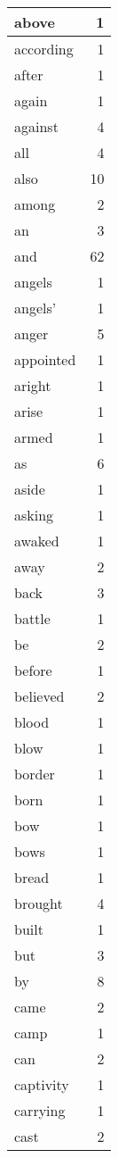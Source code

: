 \begin{center}
\begin{longtable}{l|r}
above & 1\\ \hline 
according & 1\\ \hline 
after & 1\\ \hline 
again & 1\\ \hline 
against & 4\\ \hline 
all & 4\\ \hline 
also & 10\\ \hline 
among & 2\\ \hline 
an & 3\\ \hline 
and & 62\\ \hline 
angels & 1\\ \hline 
angels' & 1\\ \hline 
anger & 5\\ \hline 
appointed & 1\\ \hline 
aright & 1\\ \hline 
arise & 1\\ \hline 
armed & 1\\ \hline 
as & 6\\ \hline 
aside & 1\\ \hline 
asking & 1\\ \hline 
awaked & 1\\ \hline 
away & 2\\ \hline 
back & 3\\ \hline 
battle & 1\\ \hline 
be & 2\\ \hline 
before & 1\\ \hline 
believed & 2\\ \hline 
blood & 1\\ \hline 
blow & 1\\ \hline 
border & 1\\ \hline 
born & 1\\ \hline 
bow & 1\\ \hline 
bows & 1\\ \hline 
bread & 1\\ \hline 
brought & 4\\ \hline 
built & 1\\ \hline 
but & 3\\ \hline 
by & 8\\ \hline 
came & 2\\ \hline 
camp & 1\\ \hline 
can & 2\\ \hline 
captivity & 1\\ \hline 
carrying & 1\\ \hline 
cast & 2\\ \hline 

\end{longtable}
\end{center}
